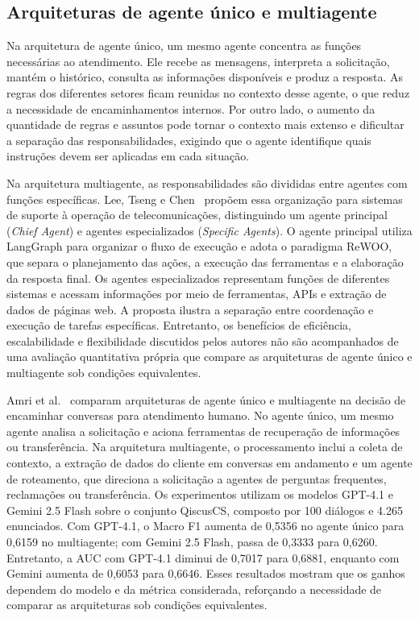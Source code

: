 \subsection{Arquiteturas de agente único e multiagente}
\label{subsec:arquiteturas}

Na arquitetura de agente único, um mesmo agente concentra as funções necessárias ao atendimento. Ele recebe as mensagens, interpreta a solicitação, mantém o histórico, consulta as informações disponíveis e produz a resposta. As regras dos diferentes setores ficam reunidas no contexto desse agente, o que reduz a necessidade de encaminhamentos internos. Por outro lado, o aumento da quantidade de regras e assuntos pode tornar o contexto mais extenso e dificultar a separação das responsabilidades, exigindo que o agente identifique quais instruções devem ser aplicadas em cada situação.

Na arquitetura multiagente, as responsabilidades são divididas entre agentes com funções específicas. Lee, Tseng e Chen~\cite{lee2025} propõem essa organização para sistemas de suporte à operação de telecomunicações, distinguindo um agente principal (\textit{Chief Agent}) e agentes especializados (\textit{Specific Agents}). O agente principal utiliza LangGraph para organizar o fluxo de execução e adota o paradigma ReWOO, que separa o planejamento das ações, a execução das ferramentas e a elaboração da resposta final. Os agentes especializados representam funções de diferentes sistemas e acessam informações por meio de ferramentas, APIs e extração de dados de páginas web. A proposta ilustra a separação entre coordenação e execução de tarefas específicas. Entretanto, os benefícios de eficiência, escalabilidade e flexibilidade discutidos pelos autores não são acompanhados de uma avaliação quantitativa própria que compare as arquiteturas de agente único e multiagente sob condições equivalentes.

Amri et al.~\cite{amri2026} comparam arquiteturas de agente único e multiagente na decisão de encaminhar conversas para atendimento humano. No agente único, um mesmo agente analisa a solicitação e aciona ferramentas de recuperação de informações ou transferência. Na arquitetura multiagente, o processamento inclui a coleta de contexto, a extração de dados do cliente em conversas em andamento e um agente de roteamento, que direciona a solicitação a agentes de perguntas frequentes, reclamações ou transferência. Os experimentos utilizam os modelos GPT-4.1 e Gemini 2.5 Flash sobre o conjunto QiscusCS, composto por 100 diálogos e 4.265 enunciados. Com GPT-4.1, o Macro F1 aumenta de 0,5356 no agente único para 0,6159 no multiagente; com Gemini 2.5 Flash, passa de 0,3333 para 0,6260. Entretanto, a AUC com GPT-4.1 diminui de 0,7017 para 0,6881, enquanto com Gemini aumenta de 0,6053 para 0,6646. Esses resultados mostram que os ganhos dependem do modelo e da métrica considerada, reforçando a necessidade de comparar as arquiteturas sob condições equivalentes.

